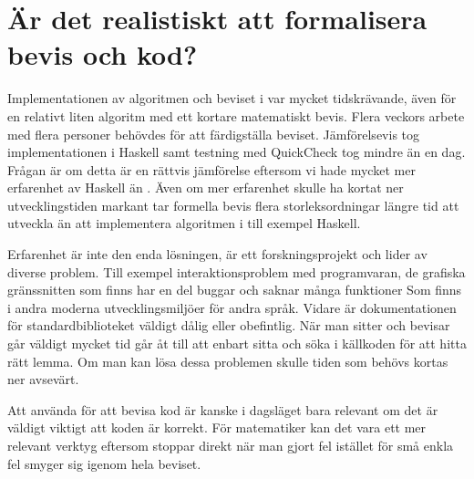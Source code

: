 \section{Är det realistiskt att formalisera bevis och kod?}
Implementationen av algoritmen och beviset i \coq{} var mycket tidskrävande,
även för en relativt liten algoritm med ett kortare matematiskt bevis. Flera
veckors arbete med flera personer behövdes för att färdigställa beviset.
Jämförelsevis tog implementationen i Haskell samt testning med QuickCheck tog
mindre än en dag. Frågan är om detta är en rättvis jämförelse eftersom vi hade
mycket mer erfarenhet av Haskell än \coq{}. Även om mer erfarenhet skulle ha
kortat ner utvecklingstiden markant tar formella bevis flera storleksordningar
längre tid att utveckla än att implementera algoritmen i till exempel Haskell.

Erfarenhet är inte den enda lösningen, \coq{} är ett forskningsprojekt och
lider av diverse problem. Till exempel interaktionsproblem med programvaran, de
grafiska gränssnitten som finns har en del buggar och saknar många funktioner
Som finns i andra moderna utvecklingsmiljöer för andra språk. Vidare är
dokumentationen för standardbiblioteket väldigt dålig eller obefintlig. När man
sitter och bevisar går väldigt mycket tid går åt till att enbart sitta och söka
i källkoden för att hitta rätt lemma. Om man kan lösa dessa problemen skulle
tiden som behövs kortas ner avsevärt.

Att använda \coq{} för att bevisa kod är kanske i dagsläget bara relevant om
det är väldigt viktigt att koden är korrekt. För matematiker kan det vara ett
mer relevant verktyg eftersom \coq{} stoppar direkt när man gjort fel istället
för små enkla fel smyger sig igenom hela beviset.

